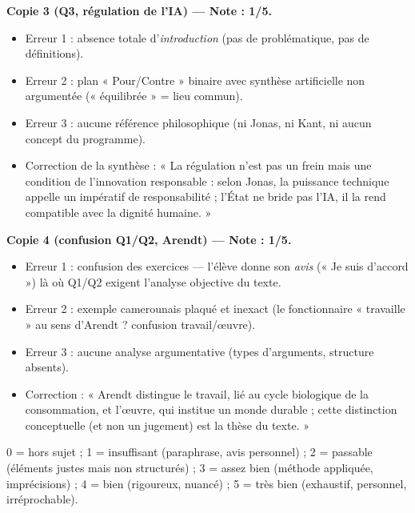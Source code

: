 \documentclass[11pt]{article}
\begin{document}
\begin{corrige}
\textbf{Copie 3 (Q3, régulation de l'IA) — Note : 1/5.}
\begin{itemize}
    \item Erreur 1 : absence totale d'\emph{introduction} (pas de problématique, pas de définitions).
    \item Erreur 2 : plan « Pour/Contre » binaire avec synthèse artificielle non argumentée (« équilibrée » = lieu commun).
    \item Erreur 3 : aucune référence philosophique (ni Jonas, ni Kant, ni aucun concept du programme).
    \item Correction de la synthèse : « La régulation n'est pas un frein mais une condition de l'innovation responsable : selon Jonas, la puissance technique appelle un impératif de responsabilité ; l'État ne bride pas l'IA, il la rend compatible avec la dignité humaine. »
\end{itemize}

\textbf{Copie 4 (confusion Q1/Q2, Arendt) — Note : 1/5.}
\begin{itemize}
    \item Erreur 1 : confusion des exercices — l'élève donne son \emph{avis} (« Je suis d'accord ») là où Q1/Q2 exigent l'analyse objective du texte.
    \item Erreur 2 : exemple camerounais plaqué et inexact (le fonctionnaire « travaille » au sens d'Arendt ? confusion travail/œuvre).
    \item Erreur 3 : aucune analyse argumentative (types d'arguments, structure absents).
    \item Correction : « Arendt distingue le travail, lié au cycle biologique de la consommation, et l'œuvre, qui institue un monde durable ; cette distinction conceptuelle (et non un jugement) est la thèse du texte. »
\end{itemize}
\end{corrige}

\begin{methode}
0 = hors sujet ; 1 = insuffisant (paraphrase, avis personnel) ; 2 = passable (éléments justes mais non structurés) ; 3 = assez bien (méthode appliquée, imprécisions) ; 4 = bien (rigoureux, nuancé) ; 5 = très bien (exhaustif, personnel, irréprochable).
\end{methode}
\end{document}
